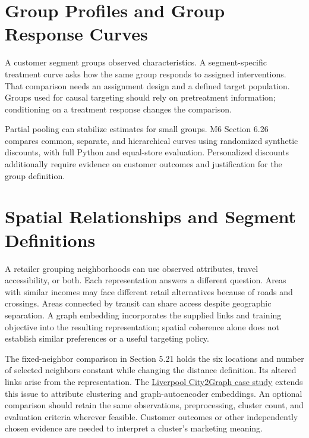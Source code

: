 \hypertarget{M04-group-profiles-and-group-response-curves}{%
\section{Group Profiles and Group Response
Curves}\label{M04-group-profiles-and-group-response-curves}}

\noindent \noindent A customer segment groups observed characteristics. A
segment-specific treatment curve asks how the same group responds to
assigned interventions. That comparison needs an assignment design and a
defined target population. Groups used for causal targeting should rely
on pretreatment information; conditioning on a treatment response
changes the comparison.

Partial pooling can stabilize estimates for small groups. M6 Section
6.26 compares common, separate, and hierarchical curves using randomized
synthetic discounts, with full Python and equal-store evaluation.
Personalized discounts additionally require evidence on customer
outcomes and justification for the group definition.

\hypertarget{M04-spatial-relationships-and-segment-definitions}{%
\section{Spatial Relationships and Segment
Definitions}\label{M04-spatial-relationships-and-segment-definitions}}

\noindent \noindent A retailer grouping neighborhoods can use observed attributes,
travel accessibility, or both. Each representation answers a different
question. Areas with similar incomes may face different retail
alternatives because of roads and crossings. Areas connected by transit
can share access despite geographic separation. A graph embedding
incorporates the supplied links and training objective into the
resulting representation; spatial coherence alone does not establish
similar preferences or a useful targeting policy.

The fixed-neighbor comparison in Section 5.21 holds the six locations
and number of selected neighbors constant while changing the distance
definition. Its altered links arise from the representation. The
\href{https://github.com/c2g-dev/city2graph-case-study}{Liverpool
City2Graph case study} extends this issue to attribute clustering and
graph-autoencoder embeddings. An optional comparison should retain the
same observations, preprocessing, cluster count, and evaluation criteria
wherever feasible. Customer outcomes or other independently chosen
evidence are needed to interpret a cluster's marketing meaning.

